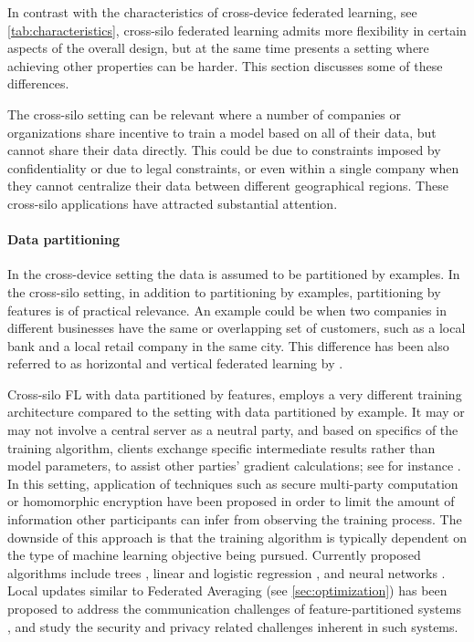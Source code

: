 \documentclass[11pt]{article}
\begin{document}
In contrast with the characteristics of cross-device federated learning, see \cref{tab:characteristics}, cross-silo federated learning admits more flexibility in certain aspects of the overall design, but at the same time presents a setting where achieving other properties can be harder. This section discusses some of these differences.

The cross-silo setting can be relevant where a number of companies or organizations share incentive to train a model based on all of their data, but cannot share their data directly. This could be due to constraints imposed by confidentiality or due to legal constraints, or even within a single company when they cannot centralize their data between different geographical regions. These cross-silo applications have attracted substantial attention.

\paragraph{Data partitioning} In the cross-device setting the data is assumed to be partitioned by examples. In the cross-silo setting, in addition to partitioning by examples, partitioning by features is of practical relevance. An example could be when two companies in different businesses have the same or overlapping set of customers, such as a local bank and a local retail company in the same city. This difference has been also referred to as horizontal and vertical federated learning by \citet{DBLP:journals/corr/abs-1902-04885}.

Cross-silo FL with data partitioned by features, employs a very different training architecture compared to the setting with data partitioned by example. It may or may not involve a central server as a neutral party, and based on specifics of the training algorithm, clients exchange specific intermediate results rather than model parameters, to assist other parties' gradient calculations; see for instance \citep[Section 2.4.2]{DBLP:journals/corr/abs-1902-04885}. In this setting, application of techniques such as secure multi-party computation or homomorphic encryption have been proposed in order to limit the amount of information other participants can infer from observing the training process. The downside of this approach is that the training algorithm is typically dependent on the type of machine learning objective being pursued. Currently proposed algorithms include trees \citep{DBLP:journals/corr/abs-1901-08755}, linear and logistic regression \citep{DBLP:journals/corr/abs-1902-04885,Hardy2017-da,liuVFL}, and neural networks \citep{liu2018secure}. Local updates similar to Federated Averaging (see \cref{sec:optimization}) has been proposed to address the communication challenges of feature-partitioned systems \citep{liuVFL}, and \citep{hu2019learning, liu2020backdoor} study the security and privacy related challenges inherent in such systems.
\end{document}
